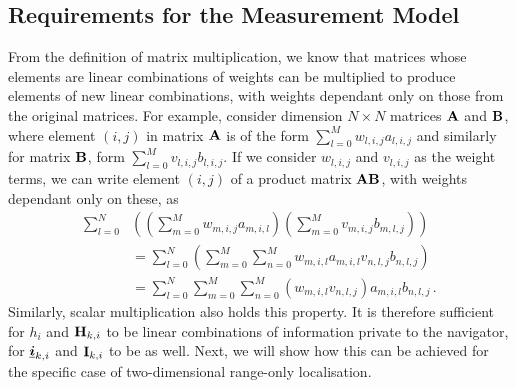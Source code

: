 \documentclass[twocolumn]{autart}
\begin{document}
% 
% 

\subsection{Requirements for the Measurement Model}
From the definition of matrix multiplication, we know that matrices whose elements are linear combinations of weights can be multiplied to produce elements of new linear combinations, with weights dependant only on those from the original matrices. For example, consider dimension $N\times N$ matrices ${{\mathbf{A}}}$ and ${{\mathbf{B}}}$, where element $(i,j)$ in matrix ${{\mathbf{A}}}$ is of the form $\sum_{l=0}^M w_{l,i,j}a_{l,i,j}$ and similarly for matrix ${{\mathbf{B}}}$, form $\sum_{l=0}^M v_{l,i,j}b_{l,i,j}$. If we consider $w_{l,i,j}$ and $v_{l,i,j}$ as the weight terms, we can write element $(i,j)$ of a product matrix ${{\mathbf{A}}}{{\mathbf{B}}}$, with weights dependant only on these, as
\begin{equation}
    \begin{split}
        \sum_{l=0}^N&\left(\left(\sum_{m=0}^M w_{m,i,j}a_{m,i,l}\right)\left(\sum_{m=0}^Mv_{m,i,j}b_{m,l,j}\right)\right) \\
        &=\sum_{l=0}^N\left(\sum_{m=0}^M\sum_{n=0}^M w_{m,i,l}a_{m,i,l}v_{n,l,j}b_{n,l,j}\right) \\
        &=\sum_{l=0}^N\sum_{m=0}^M\sum_{n=0}^M (w_{m,i,l}v_{n,l,j})a_{m,i,l}b_{n,l,j}\,.
    \end{split} \label{eqn:matrix_mult_weights}
\end{equation}
Similarly, scalar multiplication also holds this property. It is therefore sufficient for $h_i$ and ${{\mathbf{H}}}_{k,i}$ to be linear combinations of information private to the navigator, for ${\boldsymbol{\underline{i}}}_{k,i}$ and ${{\mathbf{I}}}_{k,i}$ to be as well. Next, we will show how this can be achieved for the specific case of two-dimensional range-only localisation.

% 
% 
\end{document}
